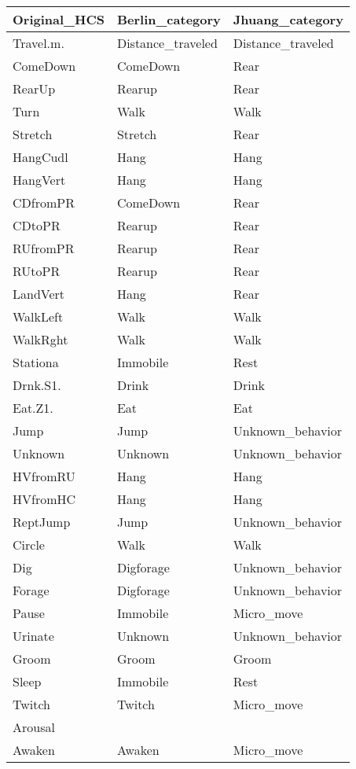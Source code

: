 \begin{table}[!htbp]
\centering
\begin{tabular}{|l|l|l|}
  \hline
Original\_HCS & Berlin\_category & Jhuang\_category \\ 
  \hline
Travel.m. & Distance\_traveled & Distance\_traveled \\ 
  ComeDown & ComeDown & Rear \\ 
  RearUp & Rearup & Rear \\ 
  Turn & Walk & Walk \\ 
  Stretch & Stretch & Rear \\ 
  HangCudl & Hang & Hang \\ 
  HangVert & Hang & Hang \\ 
  CDfromPR & ComeDown & Rear \\ 
  CDtoPR & Rearup & Rear \\ 
  RUfromPR & Rearup & Rear \\ 
  RUtoPR & Rearup & Rear \\ 
  LandVert & Hang & Rear \\ 
  WalkLeft & Walk & Walk \\ 
  WalkRght & Walk & Walk \\ 
  Stationa & Immobile & Rest \\ 
  Drnk.S1. & Drink & Drink \\ 
  Eat.Z1. & Eat & Eat \\ 
  Jump & Jump & Unknown\_behavior \\ 
  Unknown & Unknown & Unknown\_behavior \\ 
  HVfromRU & Hang & Hang \\ 
  HVfromHC & Hang & Hang \\ 
  ReptJump & Jump & Unknown\_behavior \\ 
  Circle & Walk & Walk \\ 
  Dig & Digforage & Unknown\_behavior \\ 
  Forage & Digforage & Unknown\_behavior \\ 
  Pause & Immobile & Micro\_move \\ 
  Urinate & Unknown & Unknown\_behavior \\ 
  Groom & Groom & Groom \\ 
  Sleep & Immobile & Rest \\ 
  Twitch & Twitch & Micro\_move \\ 
  Arousal &  &  \\ 
  Awaken & Awaken & Micro\_move \\ 

\end{tabular}
\end{table}
